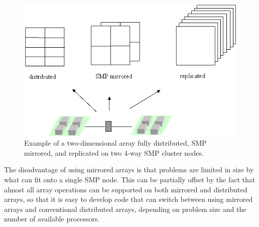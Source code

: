 %
\begin{figure}
\includegraphics[width=0.9\columnwidth]{mirrored}

\caption{\label{cap:2-D-Array}Example of a two-dimensional array fully distributed,
SMP mirrored, and replicated on two 4-way SMP cluster nodes. }

\end{figure}


The disadvantage of using mirrored arrays is that problems are limited
in size by what can fit onto a single SMP node. This can be partially
offset by the fact that almost all array operations can be supported
on both mirrored and distributed arrays, so that it is easy to develop
code that can switch between using mirrored arrays and conventional
distributed arrays, depending on problem size and the number of available
processors.


